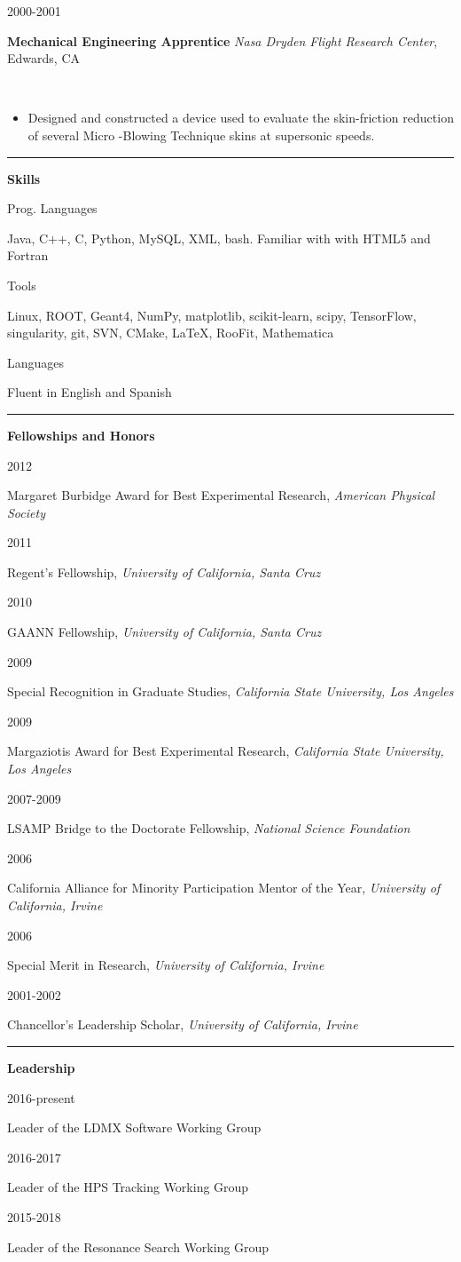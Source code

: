 \documentclass[11pt]{article}
\newcommand{\cvsection}[1] {
    \noindent
    \textcolor{indigodye}{\rule{.15\textwidth}{.1in} \hspace{0.01 \textwidth} \textbf{\Large{#1}}} \newline 
}
\newcommand{\experienceentry}[5] { 
    \noindent
    \begin{minipage}[t]{0.15\textwidth} \begin{flushright} #1 \end{flushright} \end{minipage} \hspace{0.01\textwidth}
    \begin{minipage}[t]{0.84\textwidth} 
        \textbf{#2} \newline
        \emph{#3}, #4
    \end{minipage} \\[0.01pt]
    #5 \vspace{11pt}
}
\newcommand{\skillsentry}[2] { 
    \noindent
    \begin{minipage}[t]{0.15\textwidth} \begin{flushright} #1 \end{flushright} \end{minipage} \hspace{0.01\textwidth}
    \begin{minipage}[t]{0.84\textwidth} #2 \end{minipage}
}
\newcommand{\awardentry}[3] { 
    \noindent
    \begin{minipage}[t]{0.15\textwidth} \begin{flushright} #1 \end{flushright} \end{minipage} \hspace{0.01\textwidth}
    \begin{minipage}[t]{0.84\textwidth} #2,  \emph{#3} 
    \end{minipage}
}
\newcommand{\leadentry}[2] { 
    \noindent
    \begin{minipage}[t]{0.15\textwidth} \begin{flushright} #1 \end{flushright} \end{minipage} \hspace{0.01\textwidth}
    \begin{minipage}[t]{0.84\textwidth} #2
    \end{minipage}
}
\begin{document}
        \experienceentry{2000-2001}
                        {Mechanical Engineering Apprentice}
                        {Nasa Dryden Flight Research Center}
                        {Edwards, CA}
                        {
                            \begin{itemize}[label=\textcolor{indigodye}{$\circ$}, noitemsep, nolistsep, leftmargin=0.19\textwidth]
                                \item Designed and constructed a device used to evaluate the skin-friction reduction 
                                      of several Micro -Blowing Technique skins at supersonic speeds. 
                            \end{itemize}
                        } 
    
    \cvsection{Skills}
        \skillsentry{Prog. Languages}{Java, C++, C, Python, MySQL, XML, bash. Familiar with with HTML5 and Fortran}
        \skillsentry{Tools}{Linux, ROOT, Geant4, NumPy, matplotlib, scikit-learn, scipy, TensorFlow, singularity, git, SVN, CMake, \LaTeX, RooFit, Mathematica}
        \skillsentry{Languages}{Fluent in English and Spanish}

    \cvsection{Fellowships and Honors}
        \awardentry{2012}{Margaret Burbidge Award for Best Experimental Research}{American Physical Society} 
        \awardentry{2011}{Regent's Fellowship}{University of California, Santa Cruz}
        \awardentry{2010}{GAANN Fellowship}{University of California, Santa Cruz}
        \awardentry{2009}{Special Recognition in Graduate Studies}
                         {California State University, Los Angeles}
        \awardentry{2009}{Margaziotis Award for Best Experimental Research}
                         {California State University, Los Angeles}
        \awardentry{2007-2009}{LSAMP Bridge to the Doctorate Fellowship}
                              {National Science Foundation} 
        \awardentry{2006}{California Alliance for Minority Participation Mentor of the Year}
                         {University of California, Irvine}
        \awardentry{2006}{Special Merit in Research}
                         {University of California, Irvine}
        \awardentry{2001-2002}{Chancellor's Leadership Scholar}
                         {University of California, Irvine}

    \cvsection{Leadership}
        \leadentry{2016-present}{Leader of the LDMX Software Working Group}
        \leadentry{2016-2017}{Leader of the HPS Tracking Working Group}
        \leadentry{2015-2018}{Leader of the Resonance Search Working Group}
\end{document}
